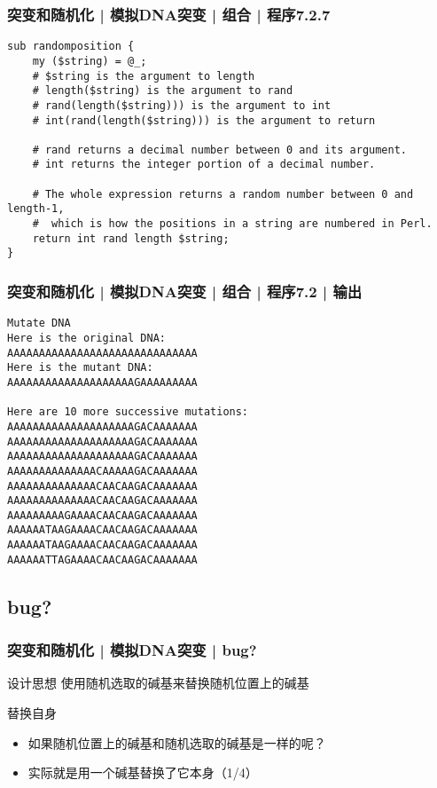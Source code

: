 \begin{frame}[fragile]
  \frametitle{突变和随机化 | 模拟DNA突变 | 组合 | 程序7.2.7}
\begin{lstlisting}[firstnumber=110,basicstyle=\footnotesize\tt,numberstyle=\scriptsize]
sub randomposition {
    my ($string) = @_;
    # $string is the argument to length
    # length($string) is the argument to rand
    # rand(length($string))) is the argument to int
    # int(rand(length($string))) is the argument to return

    # rand returns a decimal number between 0 and its argument.
    # int returns the integer portion of a decimal number.

    # The whole expression returns a random number between 0 and length-1,
    #  which is how the positions in a string are numbered in Perl.
    return int rand length $string;
}
\end{lstlisting}
\end{frame}

\begin{frame}[fragile]
  \frametitle{突变和随机化 | 模拟DNA突变 | 组合 | 程序7.2 | 输出}
\begin{lstlisting}
Mutate DNA
Here is the original DNA:
AAAAAAAAAAAAAAAAAAAAAAAAAAAAAA
Here is the mutant DNA:
AAAAAAAAAAAAAAAAAAAAGAAAAAAAAA

Here are 10 more successive mutations:
AAAAAAAAAAAAAAAAAAAAGACAAAAAAA
AAAAAAAAAAAAAAAAAAAAGACAAAAAAA
AAAAAAAAAAAAAAAAAAAAGACAAAAAAA
AAAAAAAAAAAAAACAAAAAGACAAAAAAA
AAAAAAAAAAAAAACAACAAGACAAAAAAA
AAAAAAAAAAAAAACAACAAGACAAAAAAA
AAAAAAAAAGAAAACAACAAGACAAAAAAA
AAAAAATAAGAAAACAACAAGACAAAAAAA
AAAAAATAAGAAAACAACAAGACAAAAAAA
AAAAAATTAGAAAACAACAAGACAAAAAAA
\end{lstlisting}
\end{frame}

\subsection{bug?}
\begin{frame}
  \frametitle{突变和随机化 | 模拟DNA突变 | bug?}
  \begin{block}{设计思想}
    使用随机选取的碱基来替换随机位置上的碱基
  \end{block}
  \pause
  \begin{block}{替换自身}
    \begin{itemize}
      \item 如果随机位置上的碱基和随机选取的碱基是一样的呢？
      \item 实际就是用一个碱基替换了它本身（1/4）
    \end{itemize}
  \end{block}
\end{frame}

